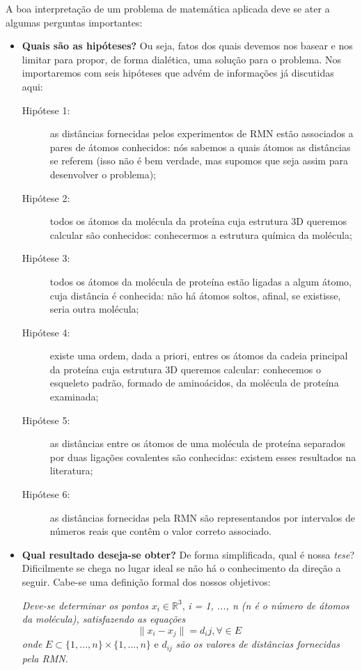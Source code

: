 \documentclass[a4paper,12pt]{article}
\begin{document}
	A boa interpretação de um problema de matemática aplicada deve se ater a algumas perguntas importantes:
	\begin{itemize}
		\item \textbf{Quais são as hipóteses?} Ou seja, fatos dos quais devemos nos basear e nos limitar para propor, de forma dialética, uma solução para o problema. Nos importaremos com seis hipóteses que advém de informações já discutidas aqui:
		\begin{description}
			\item[Hipótese 1:]as distâncias fornecidas pelos experimentos de RMN estão associados a pares de átomos conhecidos: nós sabemos a quais átomos as distâncias se referem (isso não é bem verdade, mas supomos que seja assim para desenvolver o problema);
			\item[Hipótese 2:]todos os átomos da molécula da proteína cuja estrutura 3D queremos calcular são conhecidos: conhecermos a estrutura química da molécula;
			\item[Hipótese 3:]todos os átomos da molécula de proteína estão ligadas a algum átomo, cuja distância é conhecida: não há átomos soltos, afinal, se existisse, seria outra molécula;
			\item[Hipótese 4:]existe uma ordem, dada a priori, entres os átomos da cadeia principal da proteína cuja estrutura 3D queremos calcular: conhecemos o esqueleto padrão, formado de aminoácidos, da molécula de proteína examinada;
			\item[Hipótese 5:]as distâncias entre os átomos de uma molécula de proteína separados por duas ligações covalentes são conhecidas: existem esses resultados na literatura;
			\item[Hipótese 6:]as distâncias fornecidas pela RMN são representandos por intervalos de números reais que contêm o valor correto associado.
		\end{description}
		
		\item \textbf{Qual resultado deseja-se obter?} De forma simplificada, qual é nossa \textit{tese}? Dificilmente se chega no lugar ideal se não há o conhecimento da direção a seguir. Cabe-se uma definição formal dos nossos objetivos:
		
		\textit{Deve-se determinar os pontos} $x_{i}\in\mathbb{R}^3$, \textit{i = 1, ..., n (n é o número de átomos da molécula), satisfazendo as equações}
		$$\|x_i -x_j\|=d_ij , \forall\in E
		$$
		\textit{onde} $E \subset \{1, ...,n\} \times \{1, ...,n\}$ e $d_{ij}$ \textit{são os valores de distâncias fornecidas pela RMN.}
		

\end{itemize}
\end{document}
